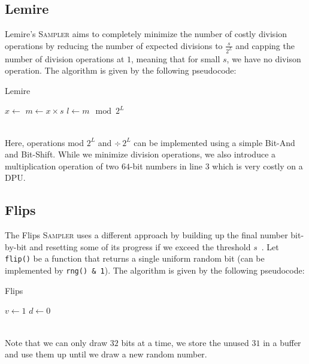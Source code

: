 \documentclass[a4paper]{scrartcl}
\begin{document}
\subsection{Lemire} \label{sec:3.3}
Lemire's \textsc{Sampler} aims to completely minimize the number of costly division operations by reducing the number of expected divisions to $\frac{s}{2^L}$ and capping the number of division operations at $1$, meaning that for small $s$, we have no divison operation.
The algorithm is given by the following pseudocode: 
\begin{algorithm}
    \caption{Lemire}
    $x \leftarrow$ \RNG\;
    $m \leftarrow x \times s$\;
    $l \leftarrow m \mod 2^L$\;
    \;
\end{algorithm}
\\
Here, operations {\small mod $2^L$} and {\small $\div\,2^L$} can be implemented using a simple Bit-And and Bit-Shift.
While we minimize division operations, we also introduce a multiplication operation of two $64$-bit numbers in line $3$ which is very costly on a DPU.



\subsection{Flips} \label{sec:3.4}
The Flips \textsc{Sampler} uses a different approach by building up the final number bit-by-bit and resetting some of its progress if we exceed the threshold $s$~\cite*{Flips}.
Let \texttt{flip()} be a function that returns a single uniform random bit (can be implemented by \texttt{rng() \& 1}).
The algorithm is given by the following pseudocode: 
\begin{algorithm}
    \caption{Flips}
    $v \leftarrow 1$\;
    $d \leftarrow 0$\;
\end{algorithm}
\\
Note that we can only draw $32$ bits at a time, we store the unused $31$ in a buffer and use them up until we draw a new random number.
\end{document}
